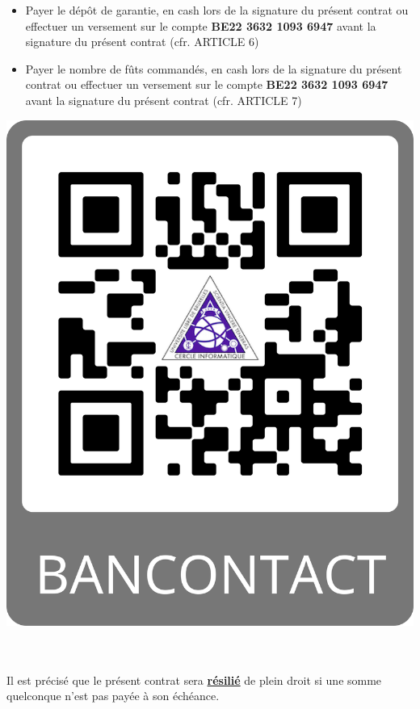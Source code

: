 \documentclass{article}
\begin{document}
\begin{minipage}{0.6\textwidth}
\begin{itemize}
    \item Payer le dépôt de garantie, en cash lors de la signature du présent contrat ou effectuer un versement sur le compte \textbf{BE22 3632 1093 6947} avant la signature du présent contrat (cfr. ARTICLE 6)
    \item Payer le nombre de fûts commandés, en cash lors de la signature du présent contrat ou effectuer un versement sur le compte \textbf{BE22 3632 1093 6947} avant la signature du présent contrat (cfr. ARTICLE 7)
\end{itemize}
\end{minipage}
\begin{minipage}{0.4\textwidth}\raggedleft
\includegraphics[scale=0.04]{images/QRCodeBancontact.png}
\end{minipage}\\\\
Il est précisé que le présent contrat sera \textbf{\underline{résilié}} de plein droit si une somme quelconque n’est pas payée à son échéance.
\end{document}
